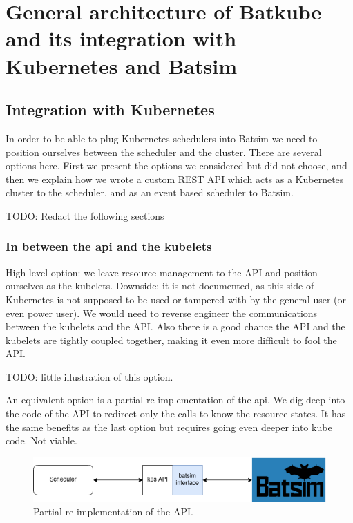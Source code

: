 \section{General architecture of Batkube and its integration with Kubernetes and Batsim}

\subsection{Integration with Kubernetes}

In order to be able to plug Kubernetes schedulers into Batsim we need to
position ourselves between the scheduler and the cluster. There are several
options here. First we present the options we considered but did not choose,
and then we explain how we wrote a custom REST API which acts as a Kubernetes
cluster to the scheduler, and as an event based scheduler to Batsim.

TODO: Redact the following sections

\subsubsection{In between the api and the kubelets}

High level option: we leave resource management to the API and position
ourselves as the kubelets. Downside: it is not documented, as this side of
Kubernetes is not supposed to be used or tampered with by the general user (or
even power user). We would need to reverse engineer the communications between
the kubelets and the API. Also there is a good chance the API and the kubelets
are tightly coupled together, making it even more difficult to fool the API.

TODO: little illustration of this option.

An equivalent option is a partial re implementation of the api. We dig deep
into the code of the API to redirect only the calls to know the resource
states. It has the same benefits as the last option but requires going even
deeper into kube code. Not viable.

\begin{figure}[h]
	\centering
	\includegraphics[width=\textwidth]{imgs/partial-reimplem.png}
	\caption{Partial re-implementation of the API.}
	\label{fig:partial_reimp}
\end{figure}

